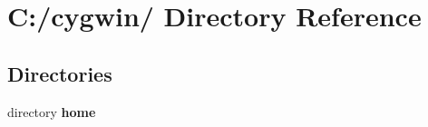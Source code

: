 \section{C:/cygwin/ Directory Reference}
\label{dir_000000}
\subsection*{Directories}
\begin{CompactItemize}
\item 
directory {\bf home}
\end{CompactItemize}
